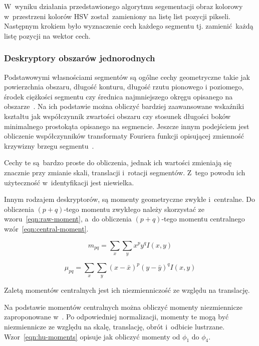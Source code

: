 W~wyniku działania przedstawionego algorytmu segementacji obraz kolorowy w~przestrzeni kolorów HSV został zamieniony na listę list pozycji pikseli. Następnym krokiem było wyznaczenie cech każdego segmentu tj. zamienić każdą listę pozycji na wektor cech.

\subsubsection{Deskryptory obszarów jednorodnych}
Podstawowymi własnościami segmentów są ogólne cechy geometryczne takie jak powierzchnia obszaru, długość konturu, długość rzutu pionowego i poziomego, środek ciężkości segmentu czy średnica najmniejszego okręgu opisanego na obszarze~\cite{perm:wyklad}. Na ich podstawie można obliczyć bardziej zaawansowane wskaźniki kształtu jak współczynnik zwartości obszaru czy stosunek długości boków minimalnego prostokąta opisanego na segmencie. Jeszcze innym podejściem jest obliczenie współczynników transformaty Fouriera funkcji opisującej zmienność krzywizny brzegu segmentu~\cite{pobr:wyklad}.

Cechy te są bardzo proste do obliczenia, jednak ich wartości zmieniają się znacznie przy zmianie skali, translacji i~rotacji segmentów. Z~tego powodu ich użyteczność w~identyfikacji jest niewielka. 

Innym rodzajem deskryptorów, są momenty geometryczne zwykłe i~centralne. Do obliczenia $(p+q)$-tego momentu zwykłego należy skorzystać ze wzoru~\ref{eqn:raw-moment}, a~do obliczenia $(p+q)$-tego momentu centralnego wzór~\ref{eqn:central-moment}.

\begin{equation}
    m_{pq} = \sum_x \sum_y x^{p} y^{q} I(x,y)
    \label{eqn:raw-moment}
\end{equation}

\begin{equation}
    \mu_{pq} = \sum_x \sum_y (x - \bar{x})^{p} (y - \bar{y})^{q} I(x,y)
    \label{eqn:central-moment}
\end{equation}

Zaletą momentów centralnych jest ich niezmienniczość ze względu na translację. 

Na podstawie momentów centralnych można obliczyć momenty niezmiennicze zaproponowane w~\cite{hu}. Po odpowiedniej normalizacji, momenty te mogą być niezmiennicze ze względu na skalę, translację, obrót i~odbicie lustrzane. Wzor~\ref{eqn:hu-moments} opisuje jak obliczyć momenty od $\phi_{1}$ do $\phi_{4}$.  

